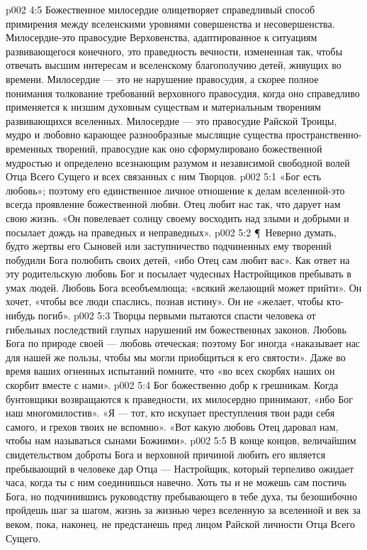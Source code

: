 \vs p002 4:5 Божественное милосердие олицетворяет справедливый способ примирения между вселенскими уровнями совершенства и несовершенства. Милосердие\hyp{}это правосудие Верховенства, адаптированное к ситуациям развивающегося конечного, это праведность вечности, измененная так, чтобы отвечать высшим интересам и вселенскому благополучию детей, живущих во времени. Милосердие --- это не нарушение правосудия, а скорее полное понимания толкование требований верховного правосудия, когда оно справедливо применяется к низшим духовным существам и материальным творениям развивающихся вселенных. Милосердие --- это правосудие Райской Троицы, мудро и любовно карающее разнообразные мыслящие существа пространственно\hyp{}временных творений, правосудие как оно сформулировано божественной мудростью и определено всезнающим разумом и независимой свободной волей Отца Всего Сущего и всех связанных с ним Творцов.
\vs p002 5:1 «Бог есть любовь»; поэтому его единственное личное отношение к делам вселенной\hyp{}это всегда проявление божественной любви. Отец любит нас так, что дарует нам свою жизнь. «Он повелевает солнцу своему восходить над злыми и добрыми и посылает дождь на праведных и неправедных».
\vs p002 5:2 \P\ Неверно думать, будто жертвы его Сыновей или заступничество подчиненных ему творений побудили Бога полюбить своих детей, «ибо Отец сам любит вас». Как ответ на эту родительскую любовь Бог и посылает чудесных Настройщиков пребывать в умах людей. Любовь Бога всеобъемлюща; «всякий желающий может прийти». Он хочет, «чтобы все люди спаслись, познав истину». Он не «желает, чтобы кто\hyp{}нибудь погиб».
\vs p002 5:3 Творцы первыми пытаются спасти человека от гибельных последствий глупых нарушений им божественных законов. Любовь Бога по природе своей --- любовь отеческая; поэтому Бог иногда «наказывает нас для нашей же пользы, чтобы мы могли приобщиться к его святости». Даже во время ваших огненных испытаний помните, что «во всех скорбях наших он скорбит вместе с нами».
\vs p002 5:4 Бог божественно добр к грешникам. Когда бунтовщики возвращаются к праведности, их милосердно принимают, «ибо Бог наш многомилостив». «Я --- тот, кто искупает преступления твои ради себя самого, и грехов твоих не вспомню». «Вот какую любовь Отец даровал нам, чтобы нам называться сынами Божиими».
\vs p002 5:5 В конце концов, величайшим свидетельством доброты Бога и верховной причиной любить его является пребывающий в человеке дар Отца --- Настройщик, который терпеливо ожидает часа, когда ты с ним соединишься навечно. Хоть ты и не можешь сам постичь Бога, но подчинившись руководству пребывающего в тебе духа, ты безошибочно пройдешь шаг за шагом, жизнь за жизнью через вселенную за вселенной и век за веком, пока, наконец, не предстанешь пред лицом Райской личности Отца Всего Сущего.
